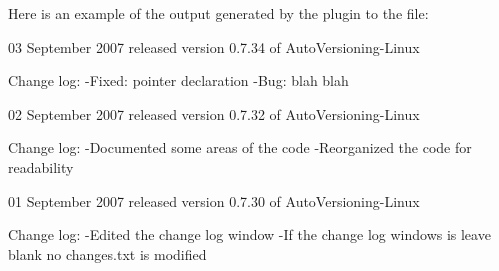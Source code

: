 Here is an example of the output generated by the plugin to the  file:

\begin{code}
03 September 2007
   released version 0.7.34 of AutoVersioning-Linux

     Change log:
        -Fixed: pointer declaration
        -Bug: blah blah

02 September 2007
   released version 0.7.32 of AutoVersioning-Linux

     Change log:
        -Documented some areas of the code
        -Reorganized the code for readability

01 September 2007
   released version 0.7.30 of AutoVersioning-Linux

     Change log:
        -Edited the change log window
        -If the change log windows is leave blank no changes.txt is modified
\end{code}
